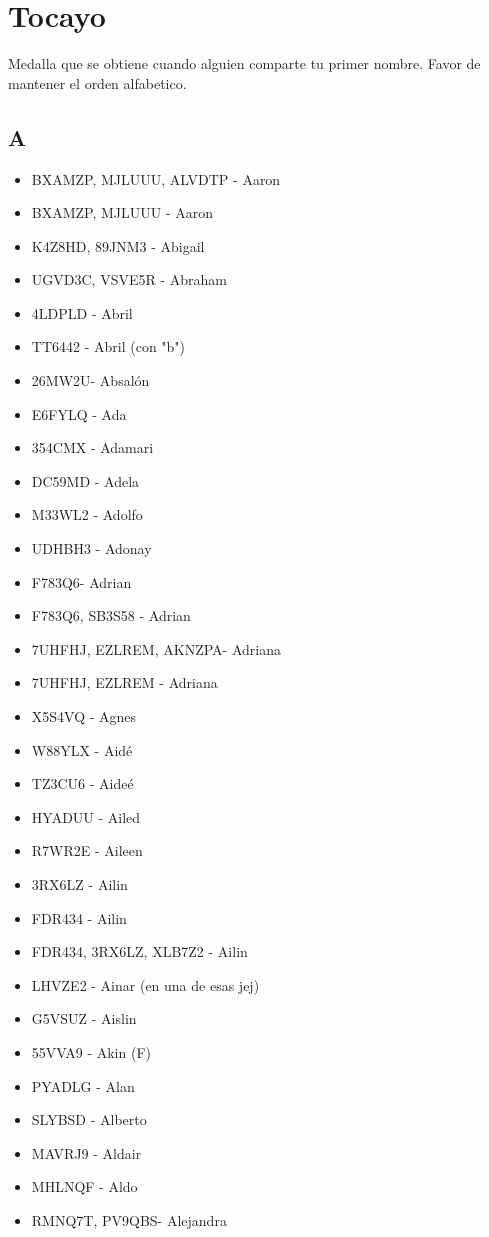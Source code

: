 \section{Tocayo}
Medalla que se obtiene cuando alguien comparte tu primer nombre. Favor de mantener el orden alfabetico.
\subsection*{A}
\begin{itemize}[leftmargin=*,nosep]
\item BXAMZP, MJLUUU, ALVDTP - Aaron
\item BXAMZP, MJLUUU - Aaron
\item K4Z8HD, 89JNM3 - Abigail
\item UGVD3C, VSVE5R  - Abraham
\item 4LDPLD - Abril
\item TT6442 - Abril (con "b")
\item 26MW2U- Absalón
\item E6FYLQ - Ada
\item 354CMX - Adamari
\item DC59MD - Adela
\item M33WL2 - Adolfo
\item UDHBH3 - Adonay
\item F783Q6- Adrian
\item F783Q6, SB3S58 - Adrian
\item 7UHFHJ, EZLREM, AKNZPA- Adriana
\item 7UHFHJ, EZLREM - Adriana
\item X5S4VQ  - Agnes
\item W88YLX - Aidé
\item TZ3CU6 - Aideé
\item HYADUU - Ailed
\item R7WR2E - Aileen
\item 3RX6LZ - Ailin
\item FDR434 - Ailin
\item FDR434, 3RX6LZ, XLB7Z2 - Ailin
\item LHVZE2 - Ainar (en una de esas jej)
\item G5VSUZ - Aislin
\item 55VVA9 - Akin (F)
\item PYADLG - Alan
\item SLYBSD - Alberto
\item MAVRJ9 - Aldair
\item MHLNQF - Aldo
\item RMNQ7T, PV9QBS- Alejandra

\end{itemize}
